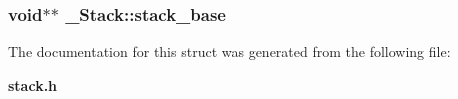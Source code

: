 \subsubsection{\setlength{\rightskip}{0pt plus 5cm}void$\ast$$\ast$ \bf{\_\-Stack::stack\_\-base}}\label{struct__Stack_fa67ceebbb669f56ba6ae209c8b1a3a8}




The documentation for this struct was generated from the following file:\begin{CompactItemize}
\item 
\bf{stack.h}\end{CompactItemize}
